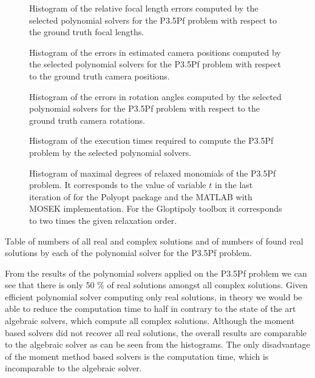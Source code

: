 \begin{figure}[ht]
  \centering
  \resizebox{0.95\textwidth}{!}{}
  \caption{Histogram of the relative focal length errors computed by the selected polynomial solvers for the P3.5Pf problem with respect to the ground truth focal lengths.}
\end{figure}

\begin{figure}[ht]
  \centering
  \resizebox{0.95\textwidth}{!}{}
  \caption{Histogram of the errors in estimated camera positions computed by the selected polynomial solvers for the P3.5Pf problem with respect to the ground truth camera positions.}
\end{figure}

\begin{figure}[ht]
  \centering
  \resizebox{0.95\textwidth}{!}{}
  \caption{Histogram of the errors in rotation angles computed by the selected polynomial solvers for the P3.5Pf problem with respect to the ground truth camera rotations.}
\end{figure}

\begin{figure}[ht]
  \centering
  \resizebox{0.95\textwidth}{!}{}
  \caption{Histogram of the execution times required to compute the P3.5Pf problem by the selected polynomial solvers.}
\end{figure}

\begin{figure}[ht]
  \centering
  \resizebox{0.95\textwidth}{!}{}
  \caption{Histogram of maximal degrees of relaxed monomials of the P3.5Pf problem. It corresponds to the value of variable $t$ in the last iteration of  for the Polyopt package and the MATLAB with MOSEK implementation. For the Gloptipoly toolbox it corresponds to two times the given relaxation order.}
\end{figure}

\begin{table}[ht]
  \centering
  
  \caption{Table of numbers of all real and complex solutions and of numbers of found real solutions by each of the polynomial solver for the P3.5Pf problem.}
\end{table}

From the results of the polynomial solvers applied on the P3.5Pf problem we can see that there is only 50 \% of real solutions amongst all complex solutions.
Given efficient polynomial solver computing only real solutions, in theory we would be able to reduce the computation time to half in contrary to the state of the art algebraic solvers, which compute all complex solutions.
Although the moment based solvers did not recover all real solutions, the overall results are comparable to the algebraic solver as can be seen from the histograms.
The only disadvantage of the moment method based solvers is the computation time, which is incomparable to the algebraic solver.
